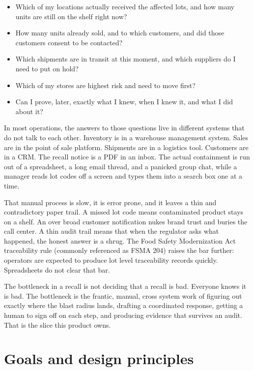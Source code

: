 \documentclass[11pt]{article}
\begin{document}
\begin{itemize}
\item Which of my locations actually received the affected lots, and how many units are still on the shelf right now?
\item How many units already sold, and to which customers, and did those customers consent to be contacted?
\item Which shipments are in transit at this moment, and which suppliers do I need to put on hold?
\item Which of my stores are highest risk and need to move first?
\item Can I prove, later, exactly what I knew, when I knew it, and what I did about it?
\end{itemize}

In most operations, the answers to those questions live in different systems that do not talk to
each other. Inventory is in a warehouse management system. Sales are in the point of sale platform.
Shipments are in a logistics tool. Customers are in a CRM. The recall notice is a PDF in an inbox.
The actual containment is run out of a spreadsheet, a long email thread, and a panicked group chat,
while a manager reads lot codes off a screen and types them into a search box one at a time.

That manual process is slow, it is error prone, and it leaves a thin and contradictory paper trail.
A missed lot code means contaminated product stays on a shelf. An over broad customer notification
nukes brand trust and buries the call center. A thin audit trail means that when the regulator asks
what happened, the honest answer is a shrug. The Food Safety Modernization Act traceability rule
(commonly referenced as FSMA 204) raises the bar further: operators are expected to produce lot
level traceability records quickly. Spreadsheets do not clear that bar.

\begin{honestbox}
The bottleneck in a recall is not deciding that a recall is bad. Everyone knows it is bad. The
bottleneck is the frantic, manual, cross system work of figuring out exactly where the blast
radius lands, drafting a coordinated response, getting a human to sign off on each step, and
producing evidence that survives an audit. That is the slice this product owns.
\end{honestbox}

\section{Goals and design principles}
\end{document}

